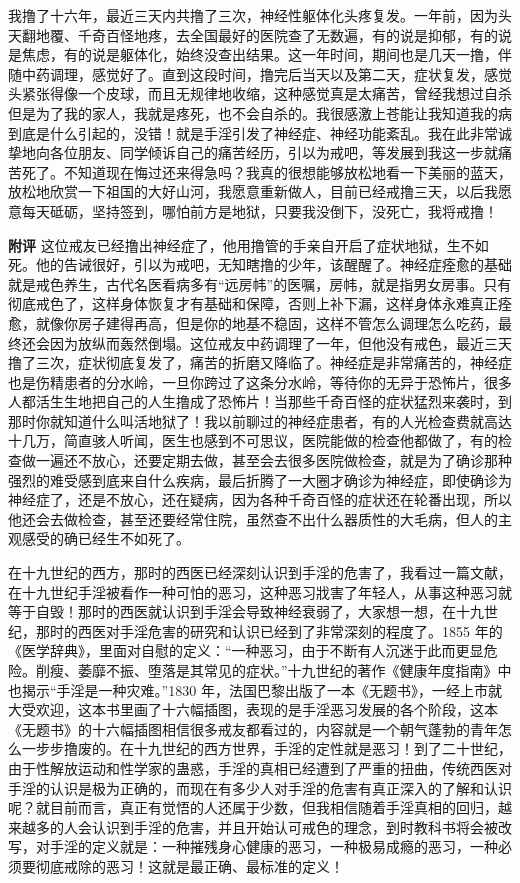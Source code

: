 \begin{case}
    我撸了十六年，最近三天内共撸了三次，神经性躯体化头疼复发。一年前，因为头天翻地覆、千奇百怪地疼，去全国最好的医院查了无数遍，有的说是抑郁，有的说是焦虑，有的说是躯体化，始终没查出结果。这一年时间，期间也是几天一撸，伴随中药调理，感觉好了。直到这段时间，撸完后当天以及第二天，症状复发，感觉头紧张得像一个皮球，而且无规律地收缩，这种感觉真是太痛苦，曾经我想过自杀但是为了我的家人，我就是疼死，也不会自杀的。我很感激上苍能让我知道我的病到底是什么引起的，没错！就是手淫引发了神经症、神经功能紊乱。我在此非常诚挚地向各位朋友、同学倾诉自己的痛苦经历，引以为戒吧，等发展到我这一步就痛苦死了。不知道现在悔过还来得急吗？我真的很想能够放松地看一下美丽的蓝天，放松地欣赏一下祖国的大好山河，我愿意重新做人，目前已经戒撸三天，以后我愿意每天砥砺，坚持签到，哪怕前方是地狱，只要我没倒下，没死亡，我将戒撸！

    \textbf{附评} 这位戒友已经撸出神经症了，他用撸管的手亲自开启了症状地狱，生不如死。他的告诫很好，引以为戒吧，无知瞎撸的少年，该醒醒了。神经症痊愈的基础就是戒色养生，古代名医看病多有“远房帏”的医嘱，房帏，就是指男女房事。只有彻底戒色了，这样身体恢复才有基础和保障，否则上补下漏，这样身体永难真正痊愈，就像你房子建得再高，但是你的地基不稳固，这样不管怎么调理怎么吃药，最终还会因为放纵而轰然倒塌。这位戒友中药调理了一年，但他没有戒色，最近三天撸了三次，症状彻底复发了，痛苦的折磨又降临了。神经症是非常痛苦的，神经症也是伤精患者的分水岭，一旦你跨过了这条分水岭，等待你的无异于恐怖片，很多人都活生生地把自己的人生撸成了恐怖片！当那些千奇百怪的症状猛烈来袭时，到那时你就知道什么叫活地狱了！我以前聊过的神经症患者，有的人光检查费就高达十几万，简直骇人听闻，医生也感到不可思议，医院能做的检查他都做了，有的检查做一遍还不放心，还要定期去做，甚至会去很多医院做检查，就是为了确诊那种强烈的难受感到底来自什么疾病，最后折腾了一大圈才确诊为神经症，即使确诊为神经症了，还是不放心，还在疑病，因为各种千奇百怪的症状还在轮番出现，所以他还会去做检查，甚至还要经常住院，虽然查不出什么器质性的大毛病，但人的主观感受的确已经生不如死了。

    在十九世纪的西方，那时的西医已经深刻认识到手淫的危害了，我看过一篇文献，在十九世纪手淫被看作一种可怕的恶习，这种恶习戕害了年轻人，从事这种恶习就等于自毁！那时的西医就认识到手淫会导致神经衰弱了，大家想一想，在十九世纪，那时的西医对手淫危害的研究和认识已经到了非常深刻的程度了。1855 年的《医学辞典》，里面对自慰的定义：“一种恶习，由于不断有人沉迷于此而更显危险。削瘦、萎靡不振、堕落是其常见的症状。”十九世纪的著作《健康年度指南》中也揭示“手淫是一种灾难。”1830 年，法国巴黎出版了一本《无题书》，一经上市就大受欢迎，这本书里画了十六幅插图，表现的是手淫恶习发展的各个阶段，这本《无题书》的十六幅插图相信很多戒友都看过的，内容就是一个朝气蓬勃的青年怎么一步步撸废的。在十九世纪的西方世界，手淫的定性就是恶习！到了二十世纪，由于性解放运动和性学家的蛊惑，手淫的真相已经遭到了严重的扭曲，传统西医对手淫的认识是极为正确的，而现在有多少人对手淫的危害有真正深入的了解和认识呢？就目前而言，真正有觉悟的人还属于少数，但我相信随着手淫真相的回归，越来越多的人会认识到手淫的危害，并且开始认可戒色的理念，到时教科书将会被改写，对手淫的定义就是：一种摧残身心健康的恶习，一种极易成瘾的恶习，一种必须要彻底戒除的恶习！这就是最正确、最标准的定义！
\end{case}

